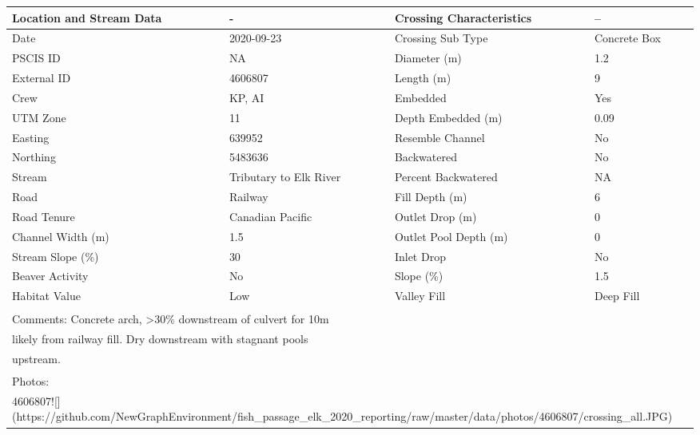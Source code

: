 \documentclass[
]{book}
\begin{document}
\begin{tabular}{l|l|l|l}
\hline
Location and Stream Data & - & Crossing Characteristics & --\\
\hline
Date & 2020-09-23 & Crossing Sub Type & Concrete Box\\
\hline
PSCIS ID & NA & Diameter (m) & 1.2\\
\hline
External ID & 4606807 & Length (m) & 9\\
\hline
Crew & KP, AI & Embedded & Yes\\
\hline
UTM Zone & 11 & Depth Embedded (m) & 0.09\\
\hline
Easting & 639952 & Resemble Channel & No\\
\hline
Northing & 5483636 & Backwatered & No\\
\hline
Stream & Tributary to Elk River & Percent Backwatered & NA\\
\hline
Road & Railway & Fill Depth (m) & 6\\
\hline
Road Tenure & Canadian Pacific & Outlet Drop (m) & 0\\
\hline
Channel Width (m) & 1.5 & Outlet Pool Depth (m) & 0\\
\hline
Stream Slope (\%) & 30 & Inlet Drop & No\\
\hline
Beaver Activity & No & Slope (\%) & 1.5\\
\hline
Habitat Value & Low & Valley Fill & Deep Fill\\
\hline
\multicolumn{4}{l}{\textsuperscript{} Comments: Concrete arch, >30\% downstream of culvert for 10m}\\
\multicolumn{4}{l}{likely from railway fill. Dry downstream with stagnant pools}\\
\multicolumn{4}{l}{upstream.}\\
\multicolumn{4}{l}{\textsuperscript{} Photos:}\\
\multicolumn{4}{l}{4606807![](https://github.com/NewGraphEnvironment/fish\_passage\_elk\_2020\_reporting/raw/master/data/photos/4606807/crossing\_all.JPG)}\\
\end{tabular}
\end{document}
